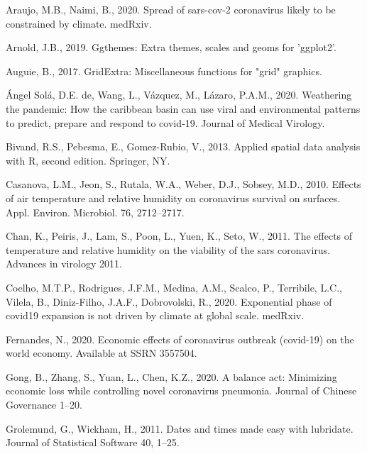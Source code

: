 \documentclass[]{elsarticle} %
\begin{document}
\leavevmode\hypertarget{ref-Araujo2020spread}{}%
Araujo, M.B., Naimi, B., 2020. Spread of sars-cov-2 coronavirus likely
to be constrained by climate. medRxiv.

\leavevmode\hypertarget{ref-Arnold2019}{}%
Arnold, J.B., 2019. Ggthemes: Extra themes, scales and geoms for
'ggplot2'.

\leavevmode\hypertarget{ref-Auguie2017gridextra}{}%
Auguie, B., 2017. GridExtra: Miscellaneous functions for "grid"
graphics.

\leavevmode\hypertarget{ref-deangel2020weathering}{}%
Ángel Solá, D.E. de, Wang, L., Vázquez, M., Lázaro, P.A.M., 2020.
Weathering the pandemic: How the caribbean basin can use viral and
environmental patterns to predict, prepare and respond to covid‐19.
Journal of Medical Virology.

\leavevmode\hypertarget{ref-Bivand2013}{}%
Bivand, R.S., Pebesma, E., Gomez-Rubio, V., 2013. Applied spatial data
analysis with R, second edition. Springer, NY.

\leavevmode\hypertarget{ref-Casanova2010effects}{}%
Casanova, L.M., Jeon, S., Rutala, W.A., Weber, D.J., Sobsey, M.D., 2010.
Effects of air temperature and relative humidity on coronavirus survival
on surfaces. Appl. Environ. Microbiol. 76, 2712--2717.

\leavevmode\hypertarget{ref-Chan2011effects}{}%
Chan, K., Peiris, J., Lam, S., Poon, L., Yuen, K., Seto, W., 2011. The
effects of temperature and relative humidity on the viability of the
sars coronavirus. Advances in virology 2011.

\leavevmode\hypertarget{ref-Coelho2020exponential}{}%
Coelho, M.T.P., Rodrigues, J.F.M., Medina, A.M., Scalco, P., Terribile,
L.C., Vilela, B., Diniz-Filho, J.A.F., Dobrovolski, R., 2020.
Exponential phase of covid19 expansion is not driven by climate at
global scale. medRxiv.

\leavevmode\hypertarget{ref-Fernandes2020economic}{}%
Fernandes, N., 2020. Economic effects of coronavirus outbreak (covid-19)
on the world economy. Available at SSRN 3557504.

\leavevmode\hypertarget{ref-Gong2020balance}{}%
Gong, B., Zhang, S., Yuan, L., Chen, K.Z., 2020. A balance act:
Minimizing economic loss while controlling novel coronavirus pneumonia.
Journal of Chinese Governance 1--20.

\leavevmode\hypertarget{ref-Grolemund2011dates}{}%
Grolemund, G., Wickham, H., 2011. Dates and times made easy with
lubridate. Journal of Statistical Software 40, 1--25.
\end{document}
